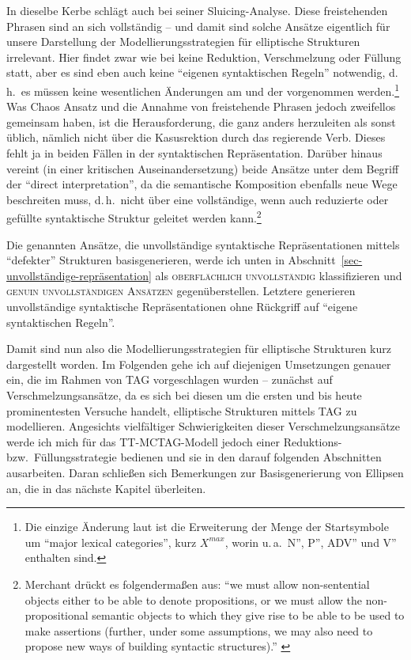 \newpage
In dieselbe Kerbe schlägt auch \citet[233ff]{Riemsdijk:78} bei seiner Sluicing-Analyse. Diese freistehenden Phrasen sind an sich vollständig -- und damit sind solche Ansätze eigentlich für unsere Darstellung der Modellierungsstrategien für elliptische Strukturen irrelevant. Hier findet zwar wie bei \cite{Chao:87} keine Reduktion, Verschmelzung oder Füllung statt, aber es sind eben auch keine "`eigenen syntaktischen Regeln"' notwendig, d.\,h.\ es müssen keine wesentlichen Änderungen am  und der  vorgenommen werden.\footnote{Die einzige Änderung laut \citet[53ff]{Barton:90} ist die Erweiterung der Menge der Startsymbole um "`major lexical categories"', kurz $X^{max}$, worin u.\,a.\ N'', P'', ADV'' und V'' enthalten sind.} Was Chaos Ansatz und die Annahme von freistehende Phrasen jedoch zweifellos gemeinsam haben, ist die Herausforderung, die  ganz anders herzuleiten als sonst üblich, nämlich nicht über die Kasusrektion durch das regierende Verb. Dieses fehlt ja in beiden Fällen in der syntaktischen Repräsentation. Darüber hinaus vereint \cite{Merchant:04} (in einer kritischen Auseinandersetzung) beide Ansätze unter dem Begriff der "`direct interpretation"', da die semantische Komposition ebenfalls neue Wege beschreiten muss, d.\,h.\ nicht über eine vollständige, wenn auch reduzierte oder gefüllte syntaktische Struktur geleitet werden kann.\footnote{Merchant drückt es folgenderma\ss en aus: "`we must allow non-sentential objects either to be able to denote propositions, or we must allow the non-propositional semantic objects to which they give rise to be able to be used to make assertions (further, under some assumptions, we may also need to propose new ways of building syntactic structures)."' \citep[662]{Merchant:04}} 

Die genannten Ansätze, die unvollständige syntaktische Repräsentationen mittels "`defekter"' Strukturen basisgenerieren, werde ich unten in Abschnitt~\ref{sec-unvollständige-repräsentation} als \textsc{oberflächlich unvollständig} klassifizieren und \textsc{genuin unvollständigen Ansätzen} gegenüberstellen. Letztere generieren unvollständige syntaktische Repräsentationen ohne Rückgriff auf "`eigene syntaktischen Regeln"'. %


Damit sind nun also die Modellierungsstrategien für elliptische Strukturen kurz dargestellt worden. Im Folgenden gehe ich auf diejenigen Umsetzungen genauer ein, die im Rahmen von TAG vorgeschlagen wurden -- zunächst auf Verschmelzungsansätze, da es sich bei diesen um die ersten und bis heute prominentesten Versuche handelt, elliptische Strukturen mittels TAG zu modellieren. Angesichts vielfältiger Schwierigkeiten dieser Verschmelzungsansätze werde ich mich für das TT-MCTAG-Modell jedoch einer Reduktions- bzw.\ Füllungsstrategie bedienen und sie in den darauf folgenden Abschnitten ausarbeiten. Daran schlie\ss en sich Bemerkungen zur Basisgenerierung von Ellipsen an, die in das nächste Kapitel überleiten.    


